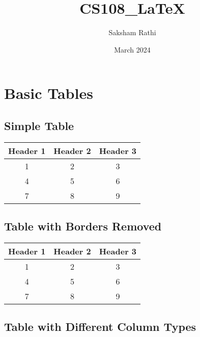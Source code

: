 \documentclass{article}
\title{CS108\_LaTeX}
\author{Saksham Rathi}
\date{March 2024}
\begin{document}
\maketitle

\section{Basic Tables}

\subsection{Simple Table}

\begin{tabular}{|c|c|c|}

\hline
Header 1 & Header 2 & Header 3 \\
\hline
1 & 2 & 3 \\
4 & 5 & 6 \\
7 & 8 & 9 \\
\hline
\end{tabular}

\subsection{Table with Borders Removed}

\begin{tabular}{ccc}
\hline
Header 1 & Header 2 & Header 3 \\
\hline
1 & 2 & 3 \\
4 & 5 & 6 \\
7 & 8 & 9 \\
\hline
\end{tabular}

\subsection{Table with Different Column Types}
\end{document}
